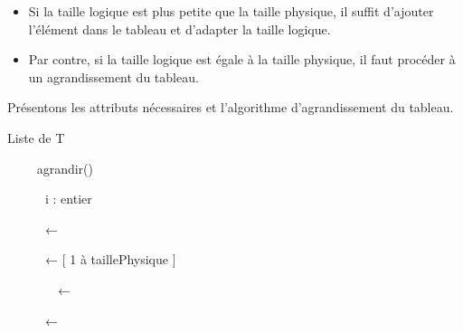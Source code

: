 \liststyleListv
\begin{itemize}
\item {
Si la taille logique est plus petite que la taille physique, il suffit
d’ajouter l’élément dans le tableau et d’adapter la taille logique.}
\item {
Par contre, si la taille logique est égale à la taille physique, il faut
procéder à un agrandissement du tableau.}
\end{itemize}
{
Présentons les attributs nécessaires et l'algorithme
d’agrandissement du tableau.}

{\sffamily
{} Liste de T}

{\sffamily
{}}

{\sffamily
{}}

{\sffamily
{}}

{\sffamily
{}}

{\sffamily
{}}

{\sffamily
\ \ \ \  agrandir()}

{\sffamily
\ \ \ \ \ \ i : entier}

{\sffamily
{}}

{\sffamily
\ \ \ \ \ \ ←
}

{\sffamily
\ \ \ \ \ \ ←
  [ 1 à taillePhysique
] }

{\sffamily
\textstyleWWPolicepardfaut{\ \ \ \ \ \ }}

{\sffamily
\ \ \ \ \ \ \ \ ←
}

{\sffamily
\textstyleWWPolicepardfaut{\ \ \ \ \ \ }\textstyleWWPolicepardfaut{
}}

{\sffamily
\ \ \ \ \ \ ←
}


